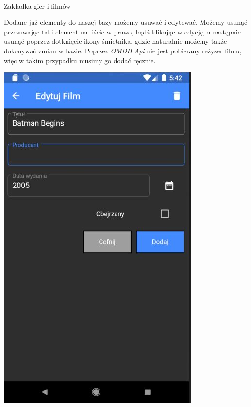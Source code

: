 \documentclass[12pt,a4paper]{article}
\begin{document}
\begin{center}
            \begin{scriptsize}
            \\ Zakładka gier i filmów
            \end{scriptsize}
    \end{center}
    Dodane już elementy do naszej bazy możemy usuwać i edytować. Możemy usunąć przesuwając taki element na liście w prawo, bądź klikając w edycję, a następnie usunąć poprzez dotknięcie ikony śmietnika, gdzie naturalnie możemy także dokonywać zmian w bazie. Poprzez \textit{OMDB Api} nie jest pobierany reżyser filmu, więc w takim przypadku musimy go dodać ręcznie.
    \begin{center}
        \includegraphics[scale=0.70]{7.JPG}

\end{center}
\end{document}
